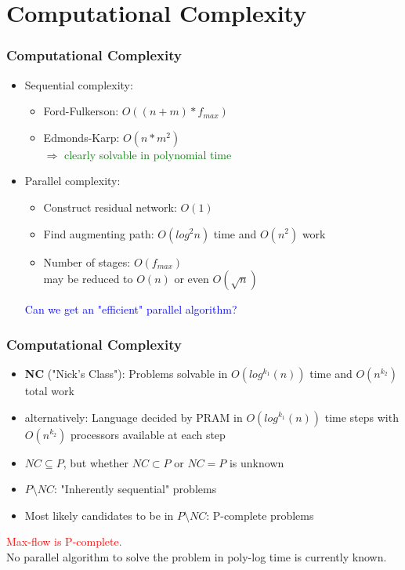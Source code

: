 \documentclass{beamer}
\begin{document}

\section{Computational Complexity}
\begin{frame}
	\frametitle{Computational Complexity}
	\begin{itemize}
		\item Sequential complexity:
		\begin{itemize}
			\item Ford-Fulkerson: $O((n+m)*f_{max})$
			\item Edmonds-Karp: $O(n*m^2)$
			\\	
			$\Rightarrow$ \textcolor{green}{clearly solvable in polynomial time}
		\end{itemize}
		\pause
		\item Parallel complexity:
		\begin{itemize}
			\item Construct residual network: $O(1)$
			\item Find augmenting path: $O(log^{2}n)$ time and $O(n^{2})$ work
			\item Number of stages: $O(f_{max})$\\
			may be reduced to $O(n)$ or even $O(\sqrt{n})$
		\end{itemize}			
		\textcolor{blue}{Can we get an "efficient" parallel algorithm?}
	\end{itemize}
\end{frame}

\begin{frame}
	\frametitle{Computational Complexity}
	\begin{itemize}
	\item \textbf{NC} ("Nick's Class"): Problems solvable in $O(log^{k_1}(n))$ time and $O(n^{k_2})$ total work
	\item alternatively: Language decided by PRAM in $O(log^{k_1}(n))$ time steps with $O(n^{k_2})$ processors available at each step 
	\item $NC \subseteq P$, but whether $NC \subset P$ or $NC = P$ is unknown 
	\item $P \setminus NC$: "Inherently sequential"  problems
	\item Most likely candidates to be in $P \setminus NC$: P-complete problems
	\end{itemize}

	\pause	
	\textcolor{red}{Max-flow is P-complete.} \\
	No parallel algorithm to solve the problem in poly-log time is currently known.	
\end{frame}
\end{document}
